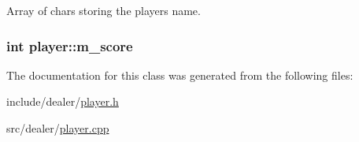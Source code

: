 Array of chars storing the players name. 

\hypertarget{classplayer_a9f5cd35f681112a6d9dde60c4c2e3104}{
\subsubsection[{m\-\_\-score}]{\setlength{\rightskip}{0pt plus 5cm}int player\-::m\-\_\-score\hspace{0.3cm}{\ttfamily [private]}}}\label{classplayer_a9f5cd35f681112a6d9dde60c4c2e3104}


The documentation for this class was generated from the following files\-:\begin{DoxyCompactItemize}
\item 
include/dealer/\hyperlink{include_2dealer_2player_8h}{player.\-h}\item 
src/dealer/\hyperlink{dealer_2player_8cpp}{player.\-cpp}\end{DoxyCompactItemize}
